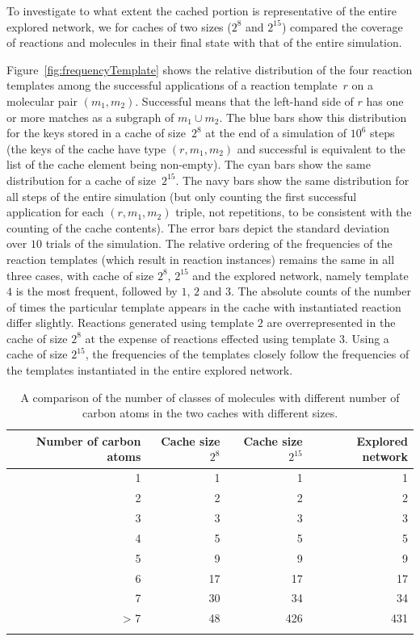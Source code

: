 To investigate to what extent the cached portion is representative of the entire explored network, we for caches of two sizes ($2^8$ and $2^{15}$) compared the coverage of reactions and molecules in their final state with that of the entire simulation.

Figure~\ref{fig:frequencyTemplate} shows the relative distribution of the four reaction templates among the successful applications of a reaction template~$r$ on a molecular pair $(m_1,m_2)$. Successful means that the left-hand side of $r$ has one or more matches as a subgraph of $m_1 \cup m_2$. The blue bars show this distribution for the keys stored in a cache of size~$2^8$ at the end of a simulation of $10^6$ steps (the keys of the cache have type $(r, m_1,m_2)$ and successful is equivalent to the list of the cache element being non-empty). The cyan bars show the same distribution for a cache of size~$2^{15}$. The navy bars show the same distribution for all steps of the entire simulation (but only counting the first successful application for each $(r, m_1,m_2)$ triple, not repetitions, to be consistent with the counting of the cache contents).
The error bars depict the standard deviation over $10$ trials of the simulation.
The relative ordering of the frequencies of the reaction templates (which result in reaction instances) remains the same in all three cases, with cache of size $2^8$, $2^{15}$ and the explored network, namely template $4$ is the most frequent, followed by $1$, $2$ and $3$. The absolute counts of the number of times the particular template appears in the cache with instantiated reaction differ slightly.
Reactions generated using template $2$ are overrepresented in the cache of size $2^8$ at the expense of reactions effected using template $3$. 
Using a cache of size $2^{15}$, the frequencies of the templates closely follow the frequencies of the templates instantiated in the entire explored network.

\begin{table}
	\centering
	\begin{footnotesize}
	\begin{tabular}{rrrr}
	\toprule
	{Number of carbon atoms} & {Cache size $2^8$} & {Cache size $2^{15}$} & {Explored network} \\
	\midrule
	1 & 1 & 1 & 1 \\
	2 & 2 & 2 & 2 \\
	3 & 3 & 3 & 3 \\
	4 & 5 & 5 & 5 \\
	5 & 9 & 9 & 9 \\
	6 & 17 & 17 & 17 \\
	7 & 30 & 34 & 34 \\
	> 7 & 48 & 426 & 431 \\
	\bottomrule\\
    \end{tabular}
    \end{footnotesize}
    \caption{A comparison of the number of classes of molecules with different number of carbon atoms in the two caches with different sizes.}
    \label{fig:molSizes}
\end{table}

